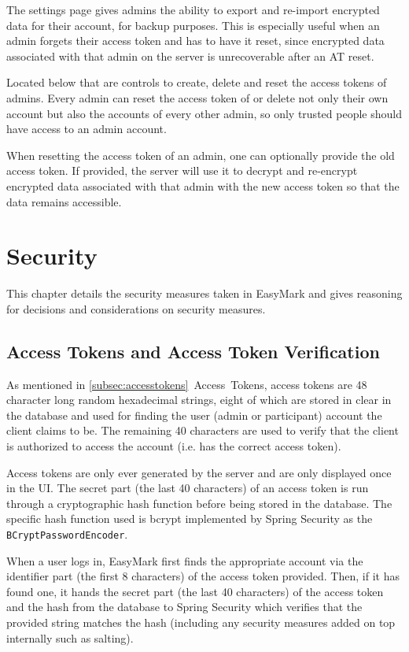 \documentclass[12pt,a4paper,oneside]{report}
\begin{document}
	The settings page gives admins the ability to export and re-import encrypted data for their account, for backup purposes. This is especially useful when an admin forgets their access token and has to have it reset, since encrypted data associated with that admin on the server is unrecoverable after an AT reset.

	Located below that are controls to create, delete and reset the access tokens of admins. Every admin can reset the access token of or delete not only their own account but also the accounts of every other admin, so only trusted people should have access to an admin account.

	When resetting the access token of an admin, one can optionally provide the old access token. If provided, the server will use it to decrypt and re-encrypt encrypted data associated with that admin with the new access token so that the data remains accessible.

	\section{Security}
	This chapter details the security measures taken in EasyMark and gives reasoning for decisions and considerations on security measures.

	\subsection{Access Tokens and Access Token Verification}
	As mentioned in \ref{subsec:accesstokens}~Access~Tokens, access tokens are 48 character long random hexadecimal strings, eight of which are stored in clear in the database and used for finding the user (admin or participant) account the client claims to be. The remaining 40 characters are used to verify that the client is authorized to access the account (i.e. has the correct access token).

	Access tokens are only ever generated by the server and are only displayed once in the UI. The secret part (the last 40 characters) of an access token is run through a cryptographic hash function before being stored in the database. The specific hash function used is bcrypt implemented by Spring Security as the \lstinline|BCryptPasswordEncoder|.

	When a user logs in, EasyMark first finds the appropriate account via the identifier part (the first 8 characters) of the access token provided. Then, if it has found one, it hands the secret part (the last 40 characters) of the access token and the hash from the database to Spring Security which verifies that the provided string matches the hash (including any security measures added on top internally such as salting).
\end{document}
